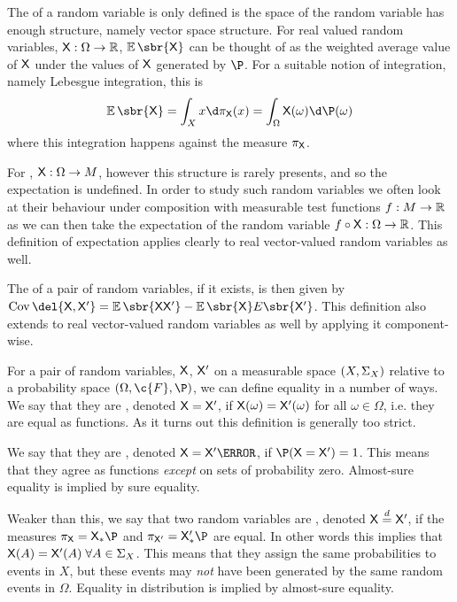 The  of a random variable is only defined is the space of the random variable has enough structure, namely vector space structure. For real valued random variables, \(\mathsf{X}:\Omega\to \mathbb{R}\), \(\E\sbr{\up{X}}\) can be thought of as the weighted average value of \(\mathsf{X}\) under the values of \(\mathsf{X}\) generated by \(\P\). For a suitable notion of integration, namely Lebesgue integration, this is
\[\E\sbr{\mathsf{X}} = \int_X x \d \pi_{\up{X}}(x) = \int_\Omega \mathsf{X}(\omega) \d\P (\omega)\]
where this integration happens against the measure \(\pi_{\mathsf{X}}\).

For , \(\mathsf{X}:\Omega\to M\), however this structure is rarely presents, and so the expectation is undefined.
In order to study such random variables we often look at their behaviour under composition with measurable test functions \(f: M \to \mathbb{R}\) as we can then take the expectation of the random variable \(f\circ \mathsf{X} : \Omega\to \mathbb{R}\).
This definition of expectation applies clearly to real vector-valued random variables as well.

The  of a pair of random variables, if it exists, is then given by \(\Cov\del{\up{X}, \up{X}'} = \E\sbr{\up{X}\up{X}'} - \E\sbr{\up{X}}E\sbr{\up{X}'}\).
This definition also extends to real vector-valued random variables as well by applying it component-wise.

For a pair of random variables, \(\mathsf{X}\), \(\mathsf{X}'\) on a measurable space \((X, \Sigma_{X})\) relative to a probability space \((\Omega, \c{F}, \P)\), we can define equality in a number of ways.
We say that they are , denoted \(\mathsf{X} = \mathsf{X}'\), if \(\mathsf{X}(\omega) = \mathsf{X}'(\omega)\) for all \(\omega \in \Omega\), i.e. they are equal as functions.
As it turns out this definition is generally too strict.

We say that they are , denoted \(\up{X} = \up{X}' \as \), if \(\P(\up{X} = \up{X}') = 1\).
This means that they agree as functions \emph{except} on sets of probability zero.
Almost-sure equality is implied by sure equality.

Weaker than this, we say that two random variables are , denoted \(\mathsf{X} \overset{d}{=} \mathsf{X}'\), if the measures \(\pi_{\up{X}} = \up{X}_*\P\) and  \(\pi_{\up{X}'} = \up{X}_*'\P\) are equal.
In other words this implies that \(\mathsf{X}(A) = \mathsf{X}'(A) \; \forall A\in \Sigma_{X}\).
This means that they assign the same probabilities to events in \(X\), but these events may \emph{not} have been generated by the same random events in \(\Omega\).
Equality in distribution is implied by almost-sure equality.

